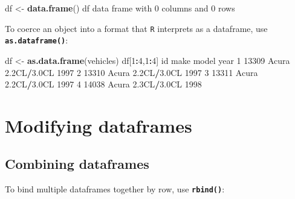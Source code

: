 \documentclass[
]{book}
\newenvironment{Shaded}{\begin{snugshade}}{\end{snugshade}}
\newcommand{\DecValTok}[1]{\textcolor[rgb]{0.00,0.00,0.81}{#1}}
\newcommand{\FloatTok}[1]{\textcolor[rgb]{0.00,0.00,0.81}{#1}}
\newcommand{\KeywordTok}[1]{\textcolor[rgb]{0.13,0.29,0.53}{\textbf{#1}}}
\newcommand{\NormalTok}[1]{#1}
\newcommand{\OperatorTok}[1]{\textcolor[rgb]{0.81,0.36,0.00}{\textbf{#1}}}
\newcommand{\StringTok}[1]{\textcolor[rgb]{0.31,0.60,0.02}{#1}}
\begin{document}
\begin{Shaded}
\begin{Highlighting}[]
\NormalTok{df <-}\StringTok{ }\KeywordTok{data.frame}\NormalTok{()}
\NormalTok{df}
\NormalTok{data frame with }\DecValTok{0}\NormalTok{ columns and }\DecValTok{0}\NormalTok{ rows}
\end{Highlighting}
\end{Shaded}

To coerce an object into a format that \texttt{R} interprets as a dataframe, use \textbf{\texttt{as.dataframe()}}:

\begin{Shaded}
\begin{Highlighting}[]
\NormalTok{df <-}\StringTok{ }\KeywordTok{as.data.frame}\NormalTok{(vehicles)}
\NormalTok{df[}\DecValTok{1}\OperatorTok{:}\DecValTok{4}\NormalTok{,}\DecValTok{1}\OperatorTok{:}\DecValTok{4}\NormalTok{]}
\NormalTok{     id  make       model year}
\DecValTok{1} \DecValTok{13309}\NormalTok{ Acura }\FloatTok{2.2}\NormalTok{CL}\OperatorTok{/}\FloatTok{3.0}\NormalTok{CL }\DecValTok{1997}
\DecValTok{2} \DecValTok{13310}\NormalTok{ Acura }\FloatTok{2.2}\NormalTok{CL}\OperatorTok{/}\FloatTok{3.0}\NormalTok{CL }\DecValTok{1997}
\DecValTok{3} \DecValTok{13311}\NormalTok{ Acura }\FloatTok{2.2}\NormalTok{CL}\OperatorTok{/}\FloatTok{3.0}\NormalTok{CL }\DecValTok{1997}
\DecValTok{4} \DecValTok{14038}\NormalTok{ Acura }\FloatTok{2.3}\NormalTok{CL}\OperatorTok{/}\FloatTok{3.0}\NormalTok{CL }\DecValTok{1998}
\end{Highlighting}
\end{Shaded}

\hypertarget{modifying-dataframes}{%
\section*{Modifying dataframes}\label{modifying-dataframes}}

\hypertarget{combining-dataframes}{%
\subsection*{Combining dataframes}\label{combining-dataframes}}

To bind multiple dataframes together by row, use \textbf{\texttt{rbind()}}:
\end{document}
